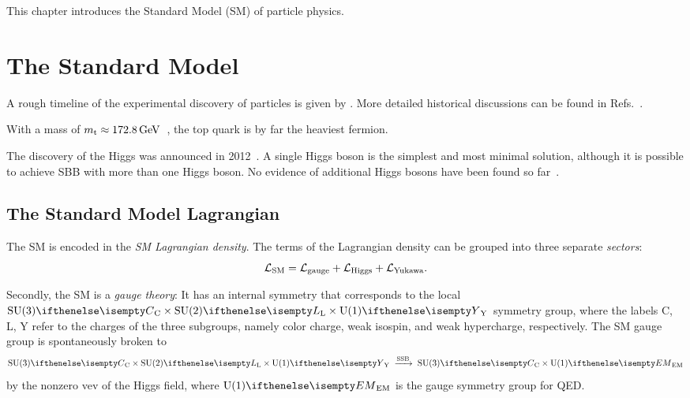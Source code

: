 

\label{sec:SM}

This chapter introduces the Standard Model (SM) of particle physics.


\section{The Standard Model}

A rough timeline of the experimental discovery of particles is given by .
More detailed historical discussions can be found in Refs.~\cite{particle_physics_history_50s,particle_physics_history_60s,particle_physics_Griffiths}.



With a mass of $m_{\text{t}}\approx172.8{\,\text{Ge\hspace{-.08em}V}}$~\cite[p.~32]{PDG_2022}, the top quark is by far the heaviest fermion.

The discovery of the Higgs was announced in 2012~\cite{Higgs_discovery_2012_CMS,Higgs_discovery_2012_ATLAS,Higgs_discovery_2013_CMS,Higgs_mass_2015_combined}. A single Higgs boson is the simplest and most minimal solution, although it is possible to achieve SBB with more than one Higgs boson. No evidence of additional Higgs bosons have been found so far~\cite{Higgs_extensions_LHC_2021}.



\subsection{The Standard Model Lagrangian}
The SM is encoded in the \emph{SM Lagrangian density}.
The terms of the Lagrangian density can be grouped into three separate \emph{sectors}:
\begin{equation}
  \mathcal{L}_\text{SM} = \mathcal{L}_\text{gauge} + \mathcal{L}_\text{Higgs} + \mathcal{L}_\text{Yukawa}.
\end{equation}

Secondly, the SM is a \emph{gauge theory}: It has an internal symmetry that corresponds to the local $\GSM$ symmetry group, where the labels C, L, Y refer to the charges of the three subgroups, namely color charge, weak isospin, and weak hypercharge, respectively.
The SM gauge group is spontaneously broken to
\begin{equation}
  \GSM \;\xrightarrow{\mathrm{SSB}}\; \SU[C]{3}\times\U[EM]{1}
\end{equation}
by the nonzero vev of the Higgs field, where $\U[EM]{1}$ is the gauge symmetry group for QED.

